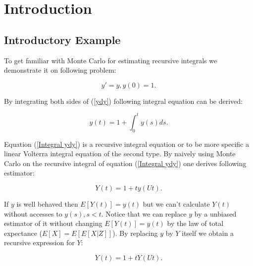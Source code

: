 \documentclass[a4paper,12pt]{article}
\begin{document}

\newpage
\tableofcontents
\newpage

\begin{abstract}
    We will write this at the end.
\end{abstract}

\section{Introduction}

\subsection{Introductory Example}
To get familiar with Monte Carlo for estimating recursive integrals
we demonstrate it on following problem:

\begin{equation} \label{ydy}
    y'=y, y(0)=1.
\end{equation}

By integrating both sides of (\ref{ydy}) following integral equation can be derived:

\begin{equation} \label{Integral ydy}
    y(t) = 1 + \int_{0}^{t} y(s) ds.
\end{equation}

Equation (\ref{Integral ydy}) is a recursive integral equation or to be more specific
a linear Volterra integral equation of the second type. By naively using Monte
Carlo on the recursive integral of equation (\ref{Integral ydy}) one derives following estimator:

\[
    Y(t) = 1 + t y(Ut)
    .\]

If $y$ is well behaved then $E[Y(t)]=y(t)$ but we can't
calculate $Y(t)$ without accesses to $y(s),s<t$. Notice that we can replace $y$ by a
unbiased estimator of it without changing $E[Y(t)]=y(t)$ by the law of total expectance
($E[X] = E[E[X|Z]]$). By replacing $y$ by $Y$ itself we obtain a recursive expression for $Y$:

\begin{equation}\label{recursive RV}
    Y(t) = 1 + tY(Ut).
\end{equation}
\end{document}
